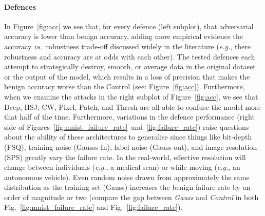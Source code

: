 \documentclass[journal]{IEEEtran}
\begin{document}
\paragraph{Defences}
    In Figure~\ref{fig:acc} we see that, for every defence (left subplot), that adversarial accuracy is lower than benign accuracy, adding more empirical evidence the accuracy \textit{vs.}~robustness trade-off discussed widely in the literature (\textit{e.g.}, there robustness and accuracy are at odds with each other).
The tested defences each attempt to strategically destroy, smooth, or average data in the original dataset or the output of the model, which results in a loss of precision that makes the benign accuracy worse than the Control (see: Figure~\ref{fig:acc}).
Furthermore, when we examine the attacks in the right subplot of Figure~\ref{fig:acc}, we see that Deep, HSJ, CW, Pixel, Patch, and Thresh are all able to confuse the model more that half of the time.
Furthermore, variations in the defence performance (right side of Figures~\ref{fig:mnist_failure_rate}~and~\ref{fig:failure_rate}) raise questions about the ability of these architectures to generalise since things like bit-depth (FSQ), training-noise (Gausss-In), label-noise (Gauss-out), and image resolution (SPS) greatly vary the failure rate.
In the real-world, effective resolution will change between individuals (\textit{e.g.}, a medical scan) or while moving (\textit{e.g.}, an autonomous vehicle).
Even random noise drawn from approximately the same distribution as the training set (Gauss) increases the benign failure rate by an order of magnitude or two (compare the gap between \textit{Gauss} and \textit{Control} in both Fig.~\ref{fig:mnist_failure_rate} and Fig.~\ref{fig:failure_rate}).
\end{document}

